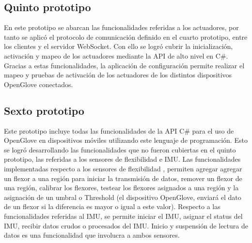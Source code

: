 \subsection{Quinto prototipo}
En este prototipo se  abarcan las funcionalidades referidas a los actuadores, por tanto se aplicó el protocolo de comunicación definido en el cuarto prototipo, entre los clientes y el servidor WebSocket. Con ello se logró cubrir la inicialización, activación y mapeo de los actuadores mediante la API de alto nivel en C\#. Gracias a estas funcionalidades, la aplicación de configuración permite realizar el mapeo y pruebas de activación de los actuadores de los distintos dispositivos OpenGlove conectados.

\subsection{Sexto prototipo}
Este prototipo incluye todas las funcionalidades de la API C\# para el uso de OpenGlove en dispositivos móviles utilizando este lenguaje de programación. Esto se logró desarrollando las funcionalidades que no fueron cubiertas en el quinto prototipo, las referidas a los sensores de flexibilidad e IMU. Las funcionalidades implementadas respecto a los sensores de flexibilidad , permiten agregar agregar un flexor a una región para iniciar la transmisión de datos, remover un flexor de una región, calibrar los flexores, testear los flexores asignados a una región y la asignación de un umbral o Threshold (el dispositivo OpenGlove, enviará el dato de un flexor si la diferencia es mayor o igual a este valor). Respecto a las funcionalidades referidas al IMU, se permite iniciar el IMU, asignar el status del IMU, recibir datos crudos o procesados del IMU. Inicio y suspensión de lectura de datos es una funcionalidad que involucra a ambos sensores.